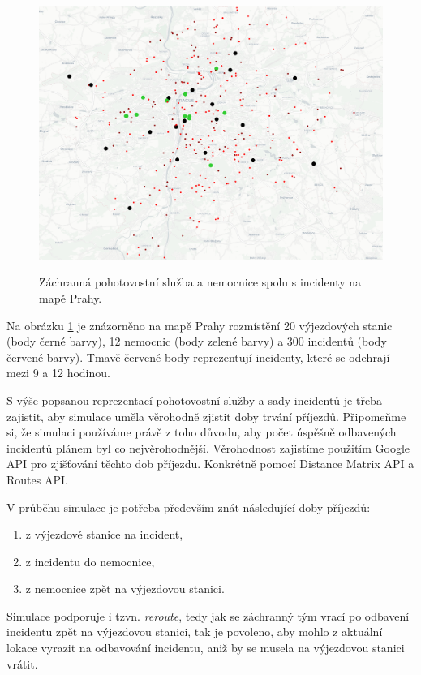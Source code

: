 \begin{figure}[H]
  \caption{Záchranná pohotovostní služba a nemocnice spolu s incidenty na mapě Prahy.}
  \includegraphics[width=\textwidth]{img/prague_monday_420.png}
  \centering
  \label{img:prague}
\end{figure}

Na obrázku \ref{img:prague} je znázorněno na mapě Prahy rozmístění 20 výjezdových stanic (body černé barvy), 12 nemocnic (body zelené barvy) a 300 incidentů (body červené barvy).
Tmavě červené body reprezentují incidenty, které se odehrají mezi 9 a 12 hodinou.

S výše popsanou reprezentací pohotovostní služby a sady incidentů je třeba zajistit, aby simulace uměla věrohodně zjistit doby trvání příjezdů.
Připomeňme si, že simulaci používáme právě z toho důvodu, aby počet úspěšně odbavených incidentů plánem byl co nejvěrohodnější.
Věrohodnost zajistíme použitím Google API pro zjišťování těchto dob příjezdu. Konkrétně pomocí Distance Matrix API a Routes API.

V průběhu simulace je potřeba především znát následující doby příjezdů:
\begin{enumerate}
  \item z výjezdové stanice na incident,
  \item z incidentu do nemocnice,
  \item z nemocnice zpět na výjezdovou stanici.
\end{enumerate}

Simulace podporuje i tzvn. \textit{reroute}, tedy jak se záchranný tým vrací po odbavení incidentu zpět na výjezdovou stanici,
tak je povoleno, aby mohlo z aktuální lokace vyrazit na odbavování incidentu, aniž by se musela na výjezdovou stanici vrátit.

